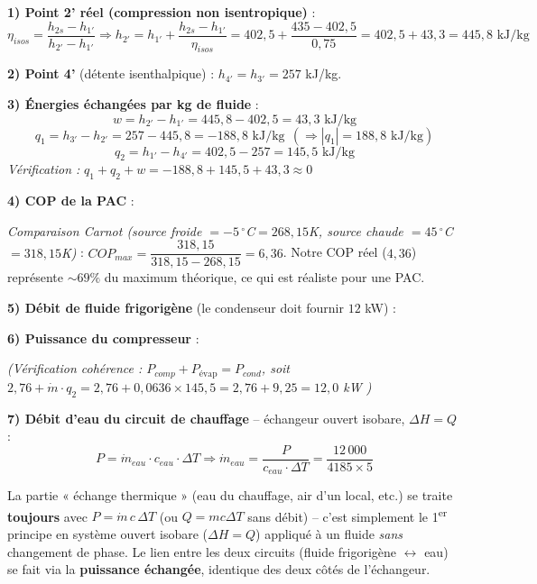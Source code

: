 \begin{correction}
\textbf{1) Point 2' réel (compression non isentropique)} :
\[\eta_{isos}=\frac{h_{2s}-h_{1'}}{h_{2'}-h_{1'}} \Rightarrow
h_{2'}=h_{1'}+\frac{h_{2s}-h_{1'}}{\eta_{isos}}=402{,}5+\frac{435-402{,}5}{0{,}75}=402{,}5+43{,}3
=445{,}8\text{ kJ/kg}\]

\textbf{2) Point 4'} (détente isenthalpique) : $h_{4'}=h_{3'}=257$ kJ/kg.

\textbf{3) Énergies échangées par kg de fluide} :
\[w=h_{2'}-h_{1'}=445{,}8-402{,}5=43{,}3\text{ kJ/kg}\]
\[q_1=h_{3'}-h_{2'}=257-445{,}8=-188{,}8\text{ kJ/kg} \ \ (\Rightarrow |q_1|=188{,}8\text{ kJ/kg})\]
\[q_2=h_{1'}-h_{4'}=402{,}5-257=145{,}5\text{ kJ/kg}\]
\emph{Vérification : } $q_1+q_2+w=-188{,}8+145{,}5+43{,}3\approx0$ \checkmark

\textbf{4) COP de la PAC} :

\emph{Comparaison Carnot (source froide $=-5\,^\circ$C$=268{,}15$K, source chaude $=45\,^\circ$C$=318{,}15$K)} :
$COP_{max}=\dfrac{318{,}15}{318{,}15-268{,}15}=6{,}36$. Notre COP réel ($4{,}36$) représente $\sim69\%$
du maximum théorique, ce qui est réaliste pour une PAC.

\textbf{5) Débit de fluide frigorigène} (le condenseur doit fournir $12$ kW) :

\textbf{6) Puissance du compresseur} :

\emph{(Vérification cohérence : $P_{comp}+P_{\text{évap}}=P_{cond}$, soit $2{,}76+\dot m\cdot q_2=2{,}76+
0{,}0636\times145{,}5=2{,}76+9{,}25=12{,}0$ kW \checkmark)}

\textbf{7) Débit d'eau du circuit de chauffage} -- échangeur ouvert isobare, $\Delta H=Q$ :
\[P=\dot m_{eau}\cdot c_{eau}\cdot\Delta T \Rightarrow
\dot m_{eau}=\frac{P}{c_{eau}\cdot\Delta T}=\frac{12\,000}{4185\times5}\]
\end{correction}

\begin{piege}
La partie « échange thermique » (eau du chauffage, air d'un local, etc.) se traite \textbf{toujours} avec
$P=\dot m\, c\,\Delta T$ (ou $Q=mc\Delta T$ sans débit) -- c'est simplement le 1\textsuperscript{er} principe
en système ouvert isobare ($\Delta H=Q$) appliqué à un fluide \emph{sans} changement de phase. Le lien entre
les deux circuits (fluide frigorigène $\leftrightarrow$ eau) se fait via la \textbf{puissance échangée},
identique des deux côtés de l'échangeur.
\end{piege}
